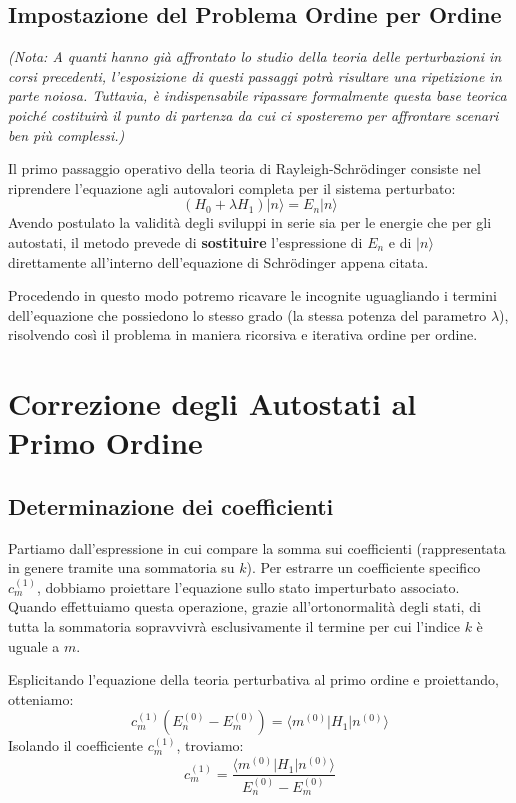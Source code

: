 \subsection{Impostazione del Problema Ordine per Ordine}

\textit{(Nota: A quanti hanno già affrontato lo studio della teoria delle perturbazioni in corsi precedenti, l'esposizione di questi passaggi potrà risultare una ripetizione in parte noiosa. Tuttavia, è indispensabile ripassare formalmente questa base teorica poiché costituirà il punto di partenza da cui ci sposteremo per affrontare scenari ben più complessi.)}

Il primo passaggio operativo della teoria di Rayleigh-Schrödinger consiste nel riprendere l'equazione agli autovalori completa per il sistema perturbato:
\begin{equation}
(H_0 + \lambda H_1) |n\rangle = E_n |n\rangle
\end{equation}
Avendo postulato la validità degli sviluppi in serie sia per le energie che per gli autostati, il metodo prevede di \textbf{sostituire} l'espressione di $E_n$ e di $\vert{}n\rangle$ direttamente all'interno dell'equazione di Schrödinger appena citata.

Procedendo in questo modo potremo ricavare le incognite uguagliando i termini dell'equazione che possiedono lo stesso grado (la stessa potenza del parametro $\lambda$), risolvendo così il problema in maniera ricorsiva e iterativa ordine per ordine.

\section{Correzione degli Autostati al Primo Ordine}

\subsection{Determinazione dei coefficienti}
Partiamo dall'espressione in cui compare la somma sui coefficienti (rappresentata in genere tramite una sommatoria su $k$). Per estrarre un coefficiente specifico $c_m^{(1)}$, dobbiamo proiettare l'equazione sullo stato imperturbato associato. Quando effettuiamo questa operazione, grazie all'ortonormalità degli stati, di tutta la sommatoria sopravvivrà esclusivamente il termine per cui l'indice $k$ è uguale a $m$.

Esplicitando l'equazione della teoria perturbativa al primo ordine e proiettando, otteniamo:
\begin{equation}
c_m^{(1)} (E_n^{(0)} - E_m^{(0)}) = \langle m^{(0)} | H_1 | n^{(0)} \rangle
\end{equation}
Isolando il coefficiente $c_m^{(1)}$, troviamo:
\begin{equation}
c_m^{(1)} = \frac{\langle m^{(0)} | H_1 | n^{(0)} \rangle}{E_n^{(0)} - E_m^{(0)}}
\end{equation}


